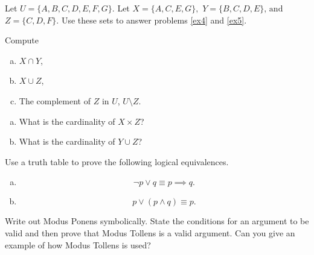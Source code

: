 \documentclass[12pt]{amsart}
\begin{document}
\noindent Let $U = \{A, B, C, D, E, F, G\}$.
Let 
$X = \{A,C,E,G\},$
$Y = \{B, C, D, E\},\, \text{and}$
$Z = \{C, D, F\}.$
Use these sets to answer problems \ref{ex4} and \ref{ex5}.
\begin{thm}[18 Points]\label{ex4}
  Compute
  \begin{enumerate}[(a)]
  \item
    $X \cap Y$,
    \vspace{2.5in}
  \item
    $X \cup Z$,
    \vspace{2.5in}
  \item
    The complement of $Z$ in $U$, $U \setminus Z$.
  \end{enumerate}
\end{thm}

\newpage

\begin{thm}[20 Points]\label{ex5}
  \begin{enumerate}[(a)]
  \item
    What is the cardinality of $X \times Z$?
    \vspace{4in}
  \item
    What is the cardinality of $Y \cup Z$?
  \end{enumerate}
\end{thm}

\newpage

\begin{thm}[20 Points]\label{ex9}
  Use a truth table to prove the following logical equivalences.
  \begin{enumerate}[(a)]
  \item
    $$\neg p \vee q \equiv p \implies q.$$
    \vspace{4in}
  \item
    $$p \vee (p \wedge q) \equiv p.$$
  \end{enumerate}
\end{thm}

\newpage

\begin{thm}\label{bonus}
  Write out Modus Ponens symbolically.
  State the conditions for an argument to be valid and then prove that Modus Tollens is a valid argument.
  Can you give an example of how Modus Tollens is used?
\end{thm}
\end{document}
